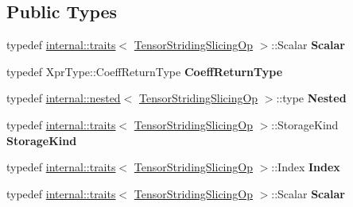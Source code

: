 \subsection*{Public Types}
\begin{DoxyCompactItemize}
\item 
\mbox{\label{class_eigen_1_1_tensor_striding_slicing_op_a0253c704173c2fca05667feb97587a24}} 
typedef \hyperlink{struct_eigen_1_1internal_1_1traits}{internal\+::traits}$<$ \hyperlink{class_eigen_1_1_tensor_striding_slicing_op}{Tensor\+Striding\+Slicing\+Op} $>$\+::Scalar {\bfseries Scalar}
\item 
\mbox{\label{class_eigen_1_1_tensor_striding_slicing_op_a922338f76ffe07b7075168ce4493141d}} 
typedef Xpr\+Type\+::\+Coeff\+Return\+Type {\bfseries Coeff\+Return\+Type}
\item 
\mbox{\label{class_eigen_1_1_tensor_striding_slicing_op_a8b07c7f20080f627973b3eadc65106d2}} 
typedef \hyperlink{struct_eigen_1_1internal_1_1nested}{internal\+::nested}$<$ \hyperlink{class_eigen_1_1_tensor_striding_slicing_op}{Tensor\+Striding\+Slicing\+Op} $>$\+::type {\bfseries Nested}
\item 
\mbox{\label{class_eigen_1_1_tensor_striding_slicing_op_a736e794e4e27140a903dcd15fd25bfe6}} 
typedef \hyperlink{struct_eigen_1_1internal_1_1traits}{internal\+::traits}$<$ \hyperlink{class_eigen_1_1_tensor_striding_slicing_op}{Tensor\+Striding\+Slicing\+Op} $>$\+::Storage\+Kind {\bfseries Storage\+Kind}
\item 
\mbox{\label{class_eigen_1_1_tensor_striding_slicing_op_a081d507785cd150f0107dc393e0b71c5}} 
typedef \hyperlink{struct_eigen_1_1internal_1_1traits}{internal\+::traits}$<$ \hyperlink{class_eigen_1_1_tensor_striding_slicing_op}{Tensor\+Striding\+Slicing\+Op} $>$\+::Index {\bfseries Index}
\item 
\mbox{\label{class_eigen_1_1_tensor_striding_slicing_op_a0253c704173c2fca05667feb97587a24}} 
typedef \hyperlink{struct_eigen_1_1internal_1_1traits}{internal\+::traits}$<$ \hyperlink{class_eigen_1_1_tensor_striding_slicing_op}{Tensor\+Striding\+Slicing\+Op} $>$\+::Scalar {\bfseries Scalar}

\end{DoxyCompactItemize}
